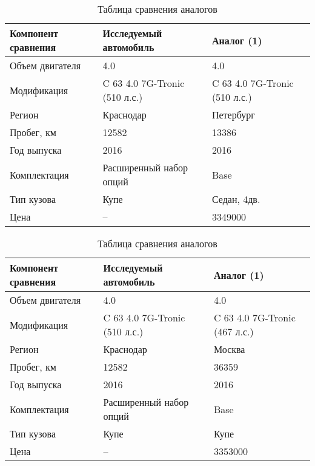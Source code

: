   \begin{longtable}{|p{51mm}|p{51mm}|p{51mm}|}
	\caption[]{\footnotesize {Таблица сравнения аналогов}} \label{tab:9}\\ 
	\hline
	\rowcolor[HTML]{EFEFEF} 
	
	Компонент сравнения & Исследуемый автомобиль& Аналог (1)  \\ \hline \endhead %
	Объем двигателя  &4.0 & 4.0 \\ \hline
	Модификация  &C 63 4.0 7G-Tronic (510 л.с.)  & C 63 4.0 7G-Tronic (510 л.с.)\\ \hline
	\rowcolor[HTML]{ FAEBD7}
	Регион  & Краснодар  & Петербург\\ \hline
	Пробег, км & 12582  & 13386\\ \hline
	Год выпуска  & 2016  & 2016 \\ \hline
		\rowcolor[HTML]{ FAEBD7}
	Комплектация  & Расширенный набор опций  & Base \\ \hline
	\rowcolor[HTML]{ FAEBD7}
	Тип кузова  & Купе  & Седан, 4дв. \\ \hline
	Цена  & --  & 3349000 \\ \hline
\end{longtable}

  \begin{longtable}{|p{51mm}|p{51mm}|p{51mm}|}
	\caption[]{\footnotesize {Таблица сравнения аналогов}} \label{tab:10}\\ 
	\hline
	\rowcolor[HTML]{EFEFEF} 
	
	Компонент сравнения & Исследуемый автомобиль& Аналог (1)  \\ \hline \endhead %
	Объем двигателя  &4.0 & 4.0 \\ \hline
    \rowcolor[HTML]{ FAEBD7} 
	Модификация  &C 63 4.0 7G-Tronic (510 л.с.)  & C 63 4.0 7G-Tronic (467 л.с.)\\ \hline
		\rowcolor[HTML]{ FAEBD7}
	Регион  & Краснодар  & Москва\\ \hline
	\rowcolor[HTML]{ FAEBD7}
	Пробег, км & 12582  & 36359\\ \hline
	Год выпуска  & 2016  & 2016 \\ \hline
	\rowcolor[HTML]{ FAEBD7}
	Комплектация  & Расширенный набор опций  & Base \\ \hline
	Тип кузова  & Купе  & Купе \\ \hline
	Цена  &  -- & 3353000 \\ \hline
\end{longtable}

